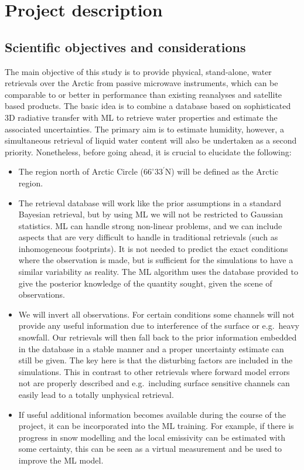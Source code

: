 \documentclass[12pt,oneside,a4paper]{article}
\begin{document}
\section{Project description}
%
\subsection{Scientific objectives and considerations}
The main objective of this study is to provide physical, stand-alone, water
retrievals over the Arctic from passive microwave instruments, which can be
comparable to or better in performance than existing reanalyses and satellite
based products. The basic idea is to combine a database based on sophisticated
3D radiative transfer with ML to retrieve water properties and estimate the
associated uncertainties. The primary aim is to estimate humidity, however, a
simultaneous retrieval of liquid water content will also be undertaken as a
second priority. Nonetheless, before going ahead, it is crucial to elucidate
the following:
\begin{itemize}
 \vspace{-1ex}
\item The region north of Arctic Circle ($66^{\circ}33^{'}$N) will be defined
  as the Arctic region.
 \vspace{-1ex}
\item The retrieval database will work like the prior assumptions in a standard
  Bayesian retrieval, but by using ML we will not be restricted to Gaussian
  statistics. ML can handle strong non-linear problems, and we can include
  aspects that are very difficult to handle in traditional retrievals (such as
  inhomogeneous footprints). It is not needed to predict the exact conditions where the observation is made, but is sufficient for the simulations to have a
  similar variability as reality. The ML algorithm uses the database provided
  to give the posterior knowledge of the quantity sought, given the scene of
  observations.
 \vspace{-1ex}
\item We will invert all observations. For certain conditions some channels
  will not provide any useful information due to interference of the surface or
  e.g.\ heavy snowfall. Our retrievals will then fall back to the prior
  information embedded in the database in a stable manner and a proper
  uncertainty estimate can still be given. The key here is that the disturbing
  factors are included in the simulations. This in contrast to other retrievals
  where forward model errors not are properly described and e.g.\ including
  surface sensitive channels can easily lead to a totally unphysical retrieval.
  \vspace{-1ex}
\item If useful additional information becomes available during the course of
  the project, it can be incorporated into the ML training. For example, if
  there is progress in snow modelling and the local emissivity can be estimated
  with some certainty, this can be seen as a virtual measurement and be used to
  improve the ML model.
\end{itemize}
\end{document}
